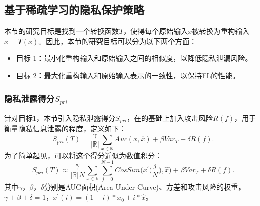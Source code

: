 \subsection{基于稀疏学习的隐私保护策略}

本节的研究目标是找到一个转换函数$T$，使得每个原始输入$x$被转换为重构输入$\widehat{x}=T(x)$。因此，本节的研究目标可以分为以下两个方面：
\begin{itemize}
\item 目标 1：最小化重构输入和原始输入之间的相似度，以降低隐私泄漏风险。
\item 目标 2：最大化重构输入和原始输入表示的一致性，以保持FL的性能。
\end{itemize}

\subsubsection{隐私泄露得分$S_{pri}$}

针对目标1，本节引入隐私泄露得分$S_{pri}$，在\cite{Automatic_Transformation_Search_Against_Deep_Leakage_From_Gradients}的基础上加入攻击风险$R(f)$，用于衡量隐私信息泄露的程度，定义如下：
\begin{equation}
S_{pri}(T)=\frac{\gamma}{|\mathbb{R}|}\sum_{x\in \mathbb{R}} {Auc}(x,{\widehat{x}})+\beta{Var}_{T}+\delta R(f).
\end{equation}
为了简单起见，可以将这个得分近似为数值积分：
\begin{equation}
S_{pri}(T)\approx \frac{\gamma}{|\mathbb{R}|N}\sum_{x\in \mathbb{R}}\sum_{j=0}^{N-1}{CosSim}\bigg(x^{\prime}\bigg(\frac{j}{N}\bigg),{\widehat{x}}\bigg)+\beta{Var}_{T}+\delta R(f).
\end{equation}
其中$\gamma$，$\beta$，$\delta$分别是AUC面积(Area Under Curve)、方差和攻击风险的权重，$\gamma+\beta+\delta=1$，${x^{\prime}(i)}={(1-i)*x_{0}+i*\widehat{x}}$。

